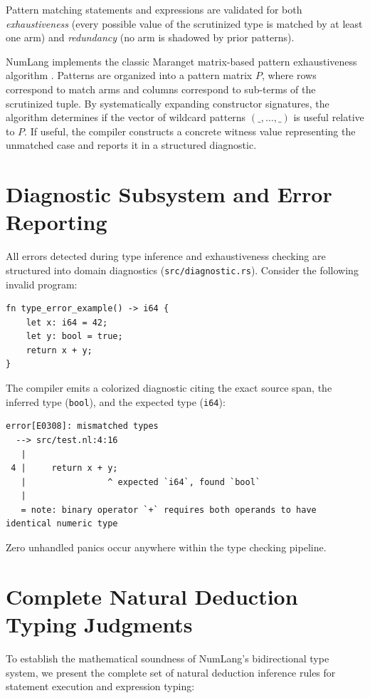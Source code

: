 Pattern matching statements and expressions are validated for both \emph{exhaustiveness} (every possible value of the scrutinized type is matched by at least one arm) and \emph{redundancy} (no arm is shadowed by prior patterns).

NumLang implements the classic Maranget matrix-based pattern exhaustiveness algorithm \citep{maranget2007warnings}. Patterns are organized into a pattern matrix $P$, where rows correspond to match arms and columns correspond to sub-terms of the scrutinized tuple. By systematically expanding constructor signatures, the algorithm determines if the vector of wildcard patterns $(\_, \dots, \_)$ is useful relative to $P$. If useful, the compiler constructs a concrete witness value representing the unmatched case and reports it in a structured diagnostic.

\section{Diagnostic Subsystem and Error Reporting}
\label{sec:types:diagnostics}

All errors detected during type inference and exhaustiveness checking are structured into domain diagnostics (\texttt{src/diagnostic.rs}). Consider the following invalid program:
\begin{lstlisting}[language=NumLang]
fn type_error_example() -> i64 {
    let x: i64 = 42;
    let y: bool = true;
    return x + y;
}
\end{lstlisting}
The compiler emits a colorized diagnostic citing the exact source span, the inferred type (\texttt{bool}), and the expected type (\texttt{i64}):
\begin{lstlisting}
error[E0308]: mismatched types
  --> src/test.nl:4:16
   |
 4 |     return x + y;
   |                ^ expected `i64`, found `bool`
   |
   = note: binary operator `+` requires both operands to have identical numeric type
\end{lstlisting}
Zero unhandled panics occur anywhere within the type checking pipeline.

\section{Complete Natural Deduction Typing Judgments}
\label{sec:types:complete_judgments}

To establish the mathematical soundness of NumLang's bidirectional type system, we present the complete set of natural deduction inference rules for statement execution and expression typing:

